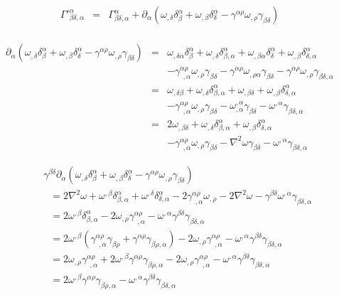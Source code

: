 \documentclass[aps,preprint,preprintnumbers,nofootinbib,showpacs,prd]{revtex4-1}
\newcommand{\nbea}{\begin{eqnarray*}}
\newcommand{\neea}{\end{eqnarray*}}
\begin{document}
%
\nbea
\Gamma'^\alpha_{\beta\delta,\alpha} & = & \Gamma^\alpha_{\beta\delta,\alpha} + \partial_\alpha\left ( \omega_{,\delta} \delta^\alpha_\beta + \omega_{,\beta}\delta^\alpha_\delta - \gamma^{\alpha\rho}\omega_{,\rho} \gamma_{\beta\delta} \right ) \\
\neea
%

%
\nbea
\partial_\alpha\left ( \omega_{,\delta} \delta^\alpha_\beta + \omega_{,\beta}\delta^\alpha_\delta - \gamma^{\alpha\rho}\omega_{,\rho} \gamma_{\beta\delta} \right ) & = & \omega_{,\delta\alpha} \delta^\alpha_\beta + \omega_{,\delta} \delta^\alpha_{\beta,\alpha} + \omega_{,\beta\alpha}\delta^\alpha_\delta + \omega_{,\beta}\delta^\alpha_{\delta,\alpha} \\
& & - \gamma^{\alpha\rho}_{~~,\alpha}\omega_{,\rho} \gamma_{\beta\delta} - \gamma^{\alpha\rho}\omega_{,\rho\alpha} \gamma_{\beta\delta} - \gamma^{\alpha\rho}\omega_{,\rho} \gamma_{\beta\delta,\alpha}\\
& = & \omega_{,\delta\beta} + \omega_{,\delta} \delta^\alpha_{\beta,\alpha} + \omega_{,\beta\delta} + \omega_{,\beta}\delta^\alpha_{\delta,\alpha} \\
& & - \gamma^{\alpha\rho}_{~~,\alpha}\omega_{,\rho} \gamma_{\beta\delta} - \omega^{,\alpha}_{,\alpha} \gamma_{\beta\delta} - \omega^{,\alpha} \gamma_{\beta\delta,\alpha}\\
& = & 2 \omega_{,\beta\delta} + \omega_{,\delta} \delta^\alpha_{\beta,\alpha} + \omega_{,\beta}\delta^\alpha_{\delta,\alpha} \\
& & - \gamma^{\alpha\rho}_{~~,\alpha}\omega_{,\rho} \gamma_{\beta\delta} - \nabla^2\omega \gamma_{\beta\delta} - \omega^{,\alpha} \gamma_{\beta\delta,\alpha}
\neea
%

%
\nbea
&& \gamma^{\beta\delta}\partial_\alpha\left ( \omega_{,\delta} \delta^\alpha_\beta + \omega_{,\beta}\delta^\alpha_\delta - \gamma^{\alpha\rho}\omega_{,\rho} \gamma_{\beta\delta} \right ) \\
&& ~~~ = 2 \nabla^2 \omega + \omega^{,\beta} \delta^\alpha_{\beta,\alpha} + \omega^{,\delta}\delta^\alpha_{\delta,\alpha} - 2 \gamma^{\alpha\rho}_{~~,\alpha}\omega_{,\rho} - 2 \nabla^2\omega - \gamma^{\beta\delta}\omega^{,\alpha} \gamma_{\beta\delta,\alpha} \\
&& ~~~ = 2 \omega^{,\beta} \delta^\alpha_{\beta,\alpha} - 2 \omega_{,\rho} \gamma^{\alpha\rho}_{~~,\alpha} - \omega^{,\alpha} \gamma^{\beta\delta} \gamma_{\beta\delta,\alpha} \\
&& ~~~ = 2 \omega^{,\beta} (\gamma^{\alpha\rho}_{~~,\alpha}\gamma_{\beta\rho} + \gamma^{\alpha\rho}\gamma_{\beta\rho,\alpha}) - 2 \omega_{,\rho} \gamma^{\alpha\rho}_{~~,\alpha} - \omega^{,\alpha} \gamma^{\beta\delta} \gamma_{\beta\delta,\alpha} \\
&& ~~~ = 2 \omega_{,\rho} \gamma^{\alpha\rho}_{~~,\alpha} + 2 \omega^{,\beta}\gamma^{\alpha\rho}\gamma_{\beta\rho,\alpha} - 2 \omega_{,\rho} \gamma^{\alpha\rho}_{~~,\alpha} - \omega^{,\alpha} \gamma^{\beta\delta} \gamma_{\beta\delta,\alpha} \\
&& ~~~ = 2 \omega^{,\beta}\gamma^{\alpha\rho}\gamma_{\beta\rho,\alpha} - \omega^{,\alpha} \gamma^{\beta\delta} \gamma_{\beta\delta,\alpha} \\
\neea
%
\end{document}
